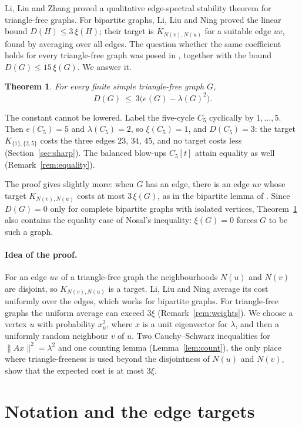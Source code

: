 \documentclass[11pt]{article}
\newtheorem{theorem}{Theorem}
\theoremstyle{remark}
\begin{document}
Li, Liu and Zhang \cite[Theorem~4.1]{LLZ} proved a qualitative edge-spectral stability theorem for
triangle-free graphs. For bipartite graphs, Li, Liu and Ning \cite[Lemma~4.3]{LLN} proved the
linear bound $D(H)\le 3\,\xi(H)$; their target is $K_{N(v),N(u)}$ for a suitable edge $uv$, found
by averaging over all edges. The question whether the same coefficient holds for every
triangle-free graph was posed in \cite{Problem}, together with the bound $D(G)\le 15\,\xi(G)$. We
answer it.

\begin{theorem}\label{thm:main}
For every finite simple triangle-free graph $G$,
\[
  D(G)\ \le\ 3\bigl(e(G)-\lambda(G)^2\bigr).
\]
\end{theorem}

The constant cannot be lowered. Label the five-cycle $C_5$ cyclically by $1,\dots,5$. Then
$e(C_5)=5$ and $\lambda(C_5)=2$, so $\xi(C_5)=1$, and $D(C_5)=3$: the target $K_{\{1\},\{2,5\}}$
costs the three edges $23$, $34$, $45$, and no target costs less (Section~\ref{sec:sharp}). The
balanced blow-ups $C_5[t]$ attain equality as well (Remark~\ref{rem:equality}).

The proof gives slightly more: when $G$ has an edge, there is an edge $uv$ whose target
$K_{N(v),N(u)}$ costs at most $3\,\xi(G)$, as in the bipartite lemma of \cite{LLN}. Since
$D(G)=0$ only for complete bipartite graphs with isolated vertices, Theorem~\ref{thm:main} also
contains the equality case of Nosal's inequality: $\xi(G)=0$ forces $G$ to be such a graph.

\paragraph{Idea of the proof.} For an edge $uv$ of a triangle-free graph the neighbourhoods
$N(u)$ and $N(v)$ are disjoint, so $K_{N(v),N(u)}$ is a target. Li, Liu and Ning average its cost
uniformly over the edges, which works for bipartite graphs. For triangle-free graphs the uniform
average can exceed $3\xi$ (Remark~\ref{rem:weights}). We choose a vertex $u$ with probability
$x_u^2$, where $x$ is a unit eigenvector for $\lambda$, and then a uniformly random neighbour $v$
of $u$. Two Cauchy--Schwarz inequalities for $\|Ax\|^2=\lambda^2$ and one counting lemma
(Lemma~\ref{lem:count}), the only place where triangle-freeness is used beyond the disjointness of
$N(u)$ and $N(v)$, show that the expected cost is at most $3\xi$.

\section{Notation and the edge targets}
\end{document}
